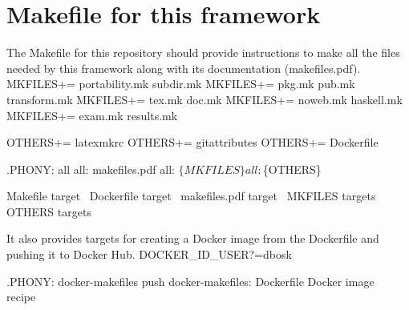 \section{Makefile for this framework}\label{Makefile}%

The {\Tt{}Makefile\nwendquote} for this repository should provide instructions to make all 
the files needed by this framework along with its documentation 
({\Tt{}makefiles.pdf\nwendquote}).
\endmoddef\nwstartdeflinemarkup{}\nwenddeflinemarkup
MKFILES+=     portability.mk subdir.mk
MKFILES+=     pkg.mk pub.mk transform.mk
MKFILES+=     tex.mk doc.mk
MKFILES+=     noweb.mk haskell.mk
MKFILES+=     exam.mk results.mk

OTHERS+=      latexmkrc
OTHERS+=      gitattributes
OTHERS+=      Dockerfile

.PHONY: all
all: makefiles.pdf
all: $\{MKFILES\}
all: $\{OTHERS\}

\LA{}Makefile target~{\nwtagstyle{}}\RA{}
\LA{}Dockerfile target~{\nwtagstyle{}}\RA{}
\LA{}makefiles.pdf target~{\nwtagstyle{}}\RA{}
\LA{}MKFILES targets~{\nwtagstyle{}}\RA{}
\LA{}OTHERS targets~{\nwtagstyle{}}\RA{}
\nwendcode{}\nwdocspar

It also provides targets for creating a Docker image from the {\Tt{}Dockerfile\nwendquote} 
and pushing it to Docker Hub.
\nwenddocs{}\plusendmoddef\nwstartdeflinemarkup{}\nwenddeflinemarkup
DOCKER_ID_USER?=dbosk

.PHONY: docker-makefiles push
docker-makefiles: Dockerfile
  \LA{}Docker image recipe~{\nwtagstyle{}}\RA{}

